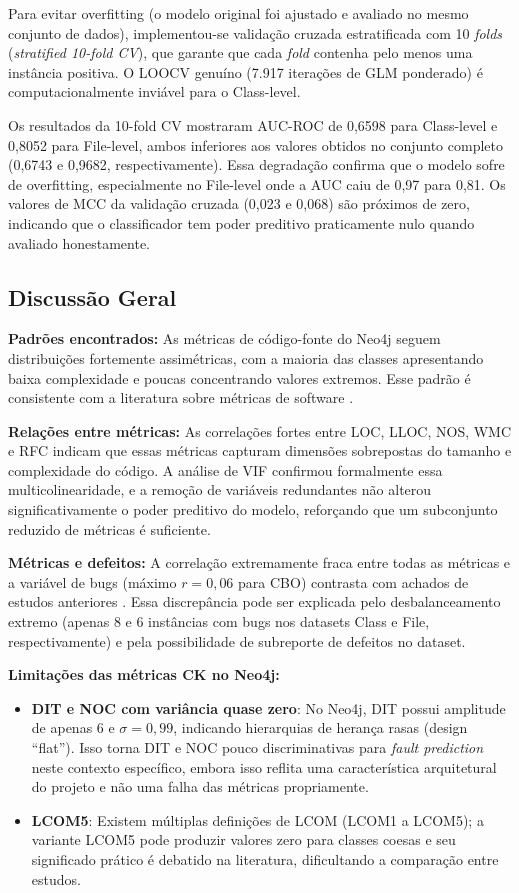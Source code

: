 \documentclass[12pt]{article}
\begin{document}
Para evitar overfitting (o modelo original foi ajustado e avaliado no mesmo conjunto de dados), implementou-se validação cruzada estratificada com 10 \textit{folds} (\textit{stratified 10-fold CV}), que garante que cada \textit{fold} contenha pelo menos uma instância positiva. O LOOCV genuíno (7.917 iterações de GLM ponderado) é computacionalmente inviável para o Class-level.

Os resultados da 10-fold CV mostraram AUC-ROC de 0,6598 para Class-level e 0,8052 para File-level, ambos inferiores aos valores obtidos no conjunto completo (0,6743 e 0,9682, respectivamente). Essa degradação confirma que o modelo sofre de overfitting, especialmente no File-level onde a AUC caiu de 0,97 para 0,81. Os valores de MCC da validação cruzada (0,023 e 0,068) são próximos de zero, indicando que o classificador tem poder preditivo praticamente nulo quando avaliado honestamente.

\subsection{Discussão Geral}

\textbf{Padrões encontrados:} As métricas de código-fonte do Neo4j seguem distribuições fortemente assimétricas, com a maioria das classes apresentando baixa complexidade e poucas concentrando valores extremos. Esse padrão é consistente com a literatura sobre métricas de software \cite{radjenovic2013, gyimothy2005}.

\textbf{Relações entre métricas:} As correlações fortes entre LOC, LLOC, NOS, WMC e RFC indicam que essas métricas capturam dimensões sobrepostas do tamanho e complexidade do código. A análise de VIF confirmou formalmente essa multicolinearidade, e a remoção de variáveis redundantes não alterou significativamente o poder preditivo do modelo, reforçando que um subconjunto reduzido de métricas é suficiente.

\textbf{Métricas e defeitos:} A correlação extremamente fraca entre todas as métricas e a variável de bugs (máximo $r = 0{,}06$ para CBO) contrasta com achados de estudos anteriores \cite{basili1996, gyimothy2005}. Essa discrepância pode ser explicada pelo desbalanceamento extremo (apenas 8 e 6 instâncias com bugs nos datasets Class e File, respectivamente) e pela possibilidade de subreporte de defeitos no dataset.

\textbf{Limitações das métricas CK no Neo4j:}
\begin{itemize}
  \item \textbf{DIT e NOC com variância quase zero}: No Neo4j, DIT possui amplitude de apenas 6 e $\sigma = 0{,}99$, indicando hierarquias de herança rasas (design ``flat''). Isso torna DIT e NOC pouco discriminativas para \textit{fault prediction} neste contexto específico, embora isso reflita uma característica arquitetural do projeto e não uma falha das métricas propriamente.
  \item \textbf{LCOM5}: Existem múltiplas definições de LCOM (LCOM1 a LCOM5); a variante LCOM5 pode produzir valores zero para classes coesas e seu significado prático é debatido na literatura, dificultando a comparação entre estudos.
\end{itemize}
\end{document}
